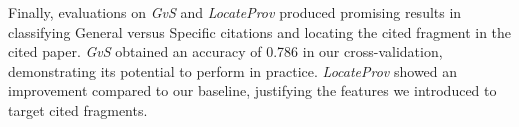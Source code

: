Finally, evaluations on {\it GvS} and {\it LocateProv} produced promising results in classifying General versus Specific citations and locating the cited fragment in the cited paper. \textit{GvS} obtained an accuracy of 0.786 in our cross-validation, demonstrating its potential to perform in practice. \textit{LocateProv} showed an improvement compared to our baseline, justifying the features we introduced to target cited fragments.
